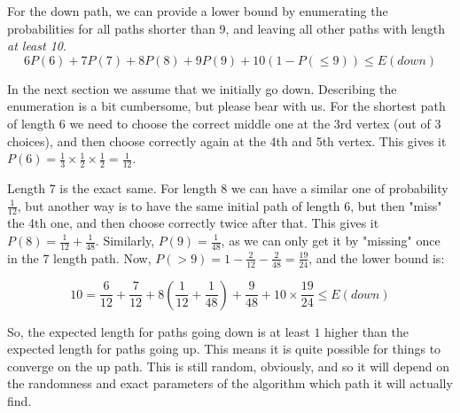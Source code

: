 \documentclass{scrartcl}
\begin{document}
For the down path, we can provide a lower bound by enumerating the
probabilities for all paths shorter than 9, and leaving all other paths
with length \emph{at least 10}.
\begin{equation}
  6  P(6) + 7  P(7) + 8  P(8) + 9  P(9) + 10(1 - P(\le9)) \le E(down)
\end{equation}

In the next section we assume that we initially go down. Describing the
enumeration is a bit cumbersome, but please bear with us. For the shortest
path of length 6 we need to choose the correct middle one at the 3rd
vertex (out of 3 choices), and then choose correctly again at the 4th and
5th vertex. This gives it $P(6) = \frac{1}{3} \times \frac{1}{2} \times
\frac{1}{2} = \frac{1}{12}$.

Length 7 is the exact same. For length 8 we can have a similar one of
probability $\frac{1}{12}$, but another way is to have the same initial
path of length 6, but then "miss" the 4th one, and then choose
correctly twice after that. This gives it $P(8) = \frac{1}{12} +
\frac{1}{48}$. Similarly, $P(9) = \frac{1}{48}$, as we can only get it by
"missing" once in the 7 length path. Now, $P(>9) = 1 - \frac{2}{12} -
\frac{2}{48} = \frac{19}{24}$, and the lower bound is:

\begin{equation}
  10 = \frac{6}{12} + \frac{7}{12} + 8(\frac{1}{12} + \frac{1}{48}) +
  \frac{9}{48} + 10 \times \frac{19}{24} \le E(down)
\end{equation}

So, the expected length for paths going down is at least $1$ higher
than the expected length for paths going up. This means it is quite
possible for things to converge on the up path. This is still random,
obviously, and so it will depend on the randomness and exact parameters of
the algorithm which path it will actually find.
\end{document}

